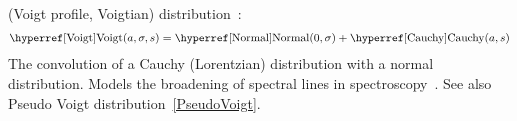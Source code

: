 \secbreak
{} (Voigt profile, Voigtian) distribution~\cite{Armstrong1967}:
\begin{align}
\label{Voigt}
\opr{Voigt}(a,\sigma,s) = \opr{Normal}(0,\sigma) + \opr{Cauchy}(a,s) \checked
\end{align}
The convolution of a Cauchy (Lorentzian) distribution with a normal distribution. Models the broadening of spectral lines in spectroscopy~\cite{Armstrong1967}. See also Pseudo Voigt distribution~\eqref{PseudoVoigt}.




